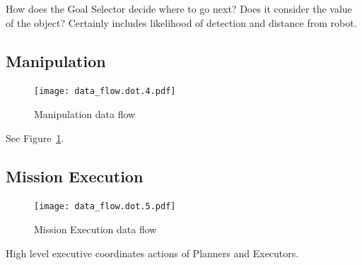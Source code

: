 \documentclass[12pt]{article}
\begin{document}
How does the Goal Selector decide where to go next? Does it consider the value of the object? Certainly includes likelihood of detection and distance from robot.

\subsection{Manipulation}\label{Manipulation}
\begin{figure}[htbp]
\centering
\texttt{[image: data\_flow.dot.4.pdf]}
\caption{Manipulation data flow}
\label{fig_df_man}
\end{figure}
See Figure~\ref{fig_df_man}.



\subsection{Mission Execution}\label{MissionExecution}
\begin{figure}[htbp]
\centering
\texttt{[image: data\_flow.dot.5.pdf]}
\caption{Mission Execution data flow}
\label{fig_df_exec}
\end{figure}

High level executive coordinates actions of Planners and Executors.



\end{document}
